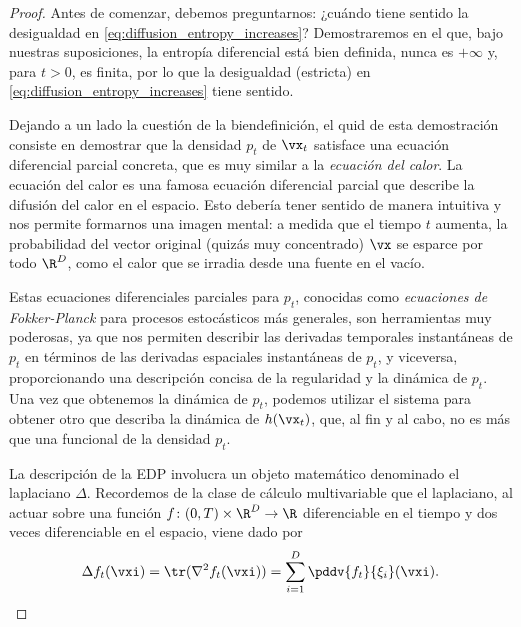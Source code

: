 \documentclass[../../book-main_es.tex]{subfiles}
\begin{document}
\begin{proof}
    Antes de comenzar, debemos preguntarnos: ¿cuándo tiene sentido la desigualdad en
    \eqref{eq:diffusion_entropy_increases}? Demostraremos
    en el  que, bajo nuestras
    suposiciones, la entropía diferencial está bien definida, nunca es
    \(+\infty\) y, para \(t > 0\), es finita, por lo que la desigualdad (estricta)
    en \eqref{eq:diffusion_entropy_increases} tiene sentido.

    Dejando a un lado la cuestión de la biendefinición, el quid de esta demostración consiste
    en demostrar que la densidad \(p_{t}\) de \(\vx_{t}\) satisface una
    ecuación diferencial parcial concreta, que es muy similar
    a la \textit{ecuación del calor}. La ecuación del calor es una famosa ecuación diferencial parcial
    que describe la difusión del calor en el espacio. Esto
    debería tener sentido de manera intuitiva y nos permite formarnos una imagen mental: a medida que
    el tiempo \(t\) aumenta, la probabilidad del vector original
    (quizás muy concentrado) \(\vx\) se esparce por todo
    \(\R^{D}\), como el calor que se irradia desde una fuente en el vacío.

    Estas ecuaciones diferenciales parciales para \(p_{t}\), conocidas como \textit{ecuaciones de Fokker-Planck}
    para procesos estocásticos más generales, son herramientas muy
    poderosas, ya que nos permiten describir las derivadas temporales instantáneas
    de \(p_{t}\) en términos de las derivadas espaciales instantáneas
    de \(p_{t}\), y viceversa, proporcionando una
    descripción concisa de la regularidad y la dinámica de \(p_{t}\).
    Una vez que obtenemos la dinámica de \(p_{t}\), podemos utilizar el sistema
    para obtener otro que describa la dinámica de
    \(h(\vx_{t})\), que, al fin y al cabo, no es más que una funcional de la densidad \(p_{t}\).

    La descripción de la EDP involucra un objeto matemático denominado
    el laplaciano \(\Delta\). Recordemos de la clase de cálculo multivariable
    que el laplaciano, al actuar sobre una función \(f \colon (0, T)
    \times \R^{D} \to \R\) diferenciable en el tiempo
    y dos veces diferenciable en el espacio, viene dado por
    \begin{equation}
        \Delta f_{t}(\vxi) = \tr(\nabla^{2}f_{t}(\vxi)) = \sum_{i =
        1}^{D}\pddv{f_{t}}{\xi_{i}}(\vxi).
    \end{equation}


\end{proof}
\end{document}
